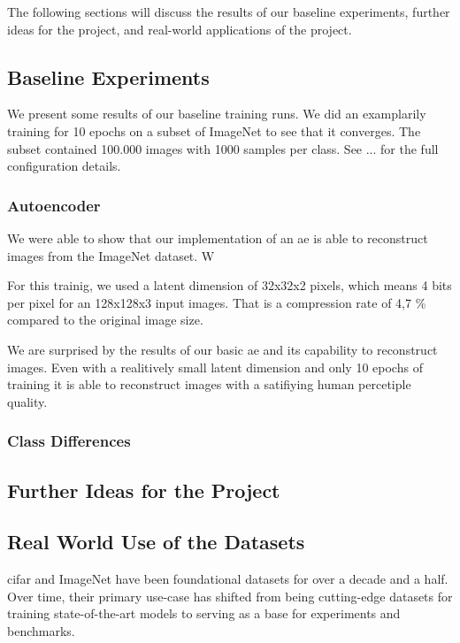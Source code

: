 The following sections will discuss the results of our baseline experiments, further ideas for the project, and real-world applications of the project.

\subsection{Baseline Experiments}\label{subsec:baseline-results}
    We present some results of our baseline training runs. We did an examplarily training for 10 epochs on a subset of ImageNet to see that it converges. The subset contained 100.000 images with 1000 samples per class. See ... for the full configuration details.
    
    \subsubsection{Autoencoder}\label{subsubsec:autoencoder}
        We were able to show that our implementation of an \ac{ae} is able to reconstruct images from the ImageNet dataset. W

        For this trainig, we used a latent dimension of 32x32x2 pixels, which means 4 bits per pixel for an 128x128x3 input images. That is a compression rate of 4,7 \% compared to the original image size.

        We are surprised by the results of our basic \ac{ae} and its capability to reconstruct images. Even with a realitively small latent dimension and only 10 epochs of training it is able to reconstruct images with a satifiying human percetiple quality.
        
        

\subsubsection{Class Differences}\label{subsubsec:class-differences}
\subsection{Further Ideas for the Project}\label{subsec:further-ideas}
\subsection{Real World Use of the Datasets}\label{subsec:real-world-applications}
\ac{cifar} and ImageNet have been foundational datasets for over a decade and a half.
Over time, their primary use-case has shifted from being cutting-edge datasets for training state-of-the-art models
to serving as a base for experiments and benchmarks.

